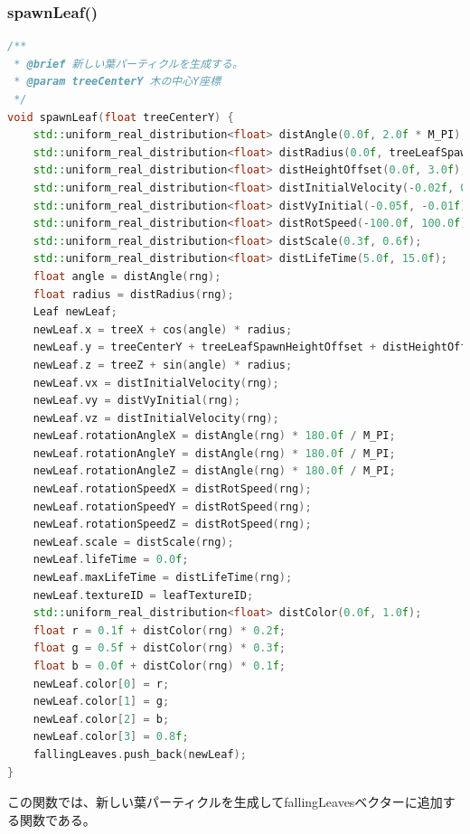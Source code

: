 \documentclass[uplatex,dvipdfmx,a4paper]{jsarticle}
\begin{document}
\hypertarget{func:spawnLeaf}{}\subsubsection{spawnLeaf()}\label{func:spawnLeaf}
\begin{lstlisting}[language=C++, caption={spawnLeaf() 関数}, label={lst:spawnLeaf_detail}]
/**
 * @brief 新しい葉パーティクルを生成する。
 * @param treeCenterY 木の中心Y座標
 */
void spawnLeaf(float treeCenterY) {
    std::uniform_real_distribution<float> distAngle(0.0f, 2.0f * M_PI);
    std::uniform_real_distribution<float> distRadius(0.0f, treeLeafSpawnRadius);
    std::uniform_real_distribution<float> distHeightOffset(0.0f, 3.0f);
    std::uniform_real_distribution<float> distInitialVelocity(-0.02f, 0.02f);
    std::uniform_real_distribution<float> distVyInitial(-0.05f, -0.01f);
    std::uniform_real_distribution<float> distRotSpeed(-100.0f, 100.0f);
    std::uniform_real_distribution<float> distScale(0.3f, 0.6f);
    std::uniform_real_distribution<float> distLifeTime(5.0f, 15.0f);
    float angle = distAngle(rng);
    float radius = distRadius(rng);
    Leaf newLeaf;
    newLeaf.x = treeX + cos(angle) * radius;
    newLeaf.y = treeCenterY + treeLeafSpawnHeightOffset + distHeightOffset(rng);
    newLeaf.z = treeZ + sin(angle) * radius;
    newLeaf.vx = distInitialVelocity(rng);
    newLeaf.vy = distVyInitial(rng);
    newLeaf.vz = distInitialVelocity(rng);
    newLeaf.rotationAngleX = distAngle(rng) * 180.0f / M_PI;
    newLeaf.rotationAngleY = distAngle(rng) * 180.0f / M_PI;
    newLeaf.rotationAngleZ = distAngle(rng) * 180.0f / M_PI;
    newLeaf.rotationSpeedX = distRotSpeed(rng);
    newLeaf.rotationSpeedY = distRotSpeed(rng);
    newLeaf.rotationSpeedZ = distRotSpeed(rng);
    newLeaf.scale = distScale(rng);
    newLeaf.lifeTime = 0.0f;
    newLeaf.maxLifeTime = distLifeTime(rng);
    newLeaf.textureID = leafTextureID;
    std::uniform_real_distribution<float> distColor(0.0f, 1.0f);
    float r = 0.1f + distColor(rng) * 0.2f;
    float g = 0.5f + distColor(rng) * 0.3f;
    float b = 0.0f + distColor(rng) * 0.1f;
    newLeaf.color[0] = r;
    newLeaf.color[1] = g;
    newLeaf.color[2] = b;
    newLeaf.color[3] = 0.8f;
    fallingLeaves.push_back(newLeaf);
}
\end{lstlisting}
この関数では、新しい葉パーティクルを生成してfallingLeavesベクターに追加する関数である。
\end{document}
